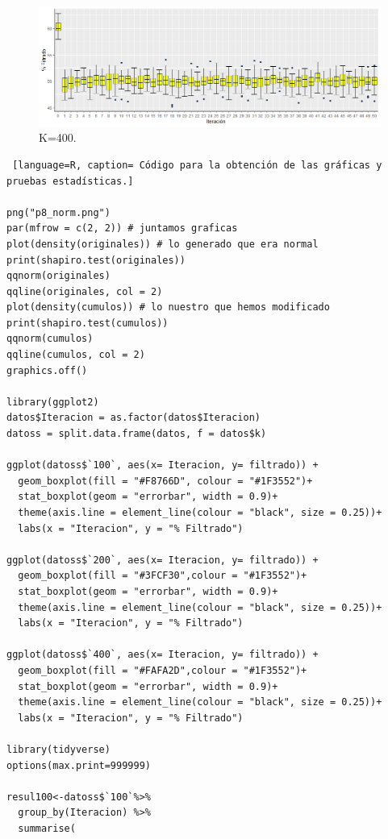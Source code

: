 \documentclass{article}
\begin{document}
\newpage
\begin{figure} [h!]%
\renewcommand{\figurename}{Gráfica}
    \centering
    \caption{ K=400.}
    \label{grafica3}
    \includegraphics[width=170mm]{grafica3.png} %
\end{figure}

\begin{lstlisting} [language=R, caption= Código para la obtención de las gráficas y pruebas estadísticas.]

png("p8_norm.png")
par(mfrow = c(2, 2)) # juntamos graficas
plot(density(originales)) # lo generado que era normal
print(shapiro.test(originales))
qqnorm(originales)
qqline(originales, col = 2)
plot(density(cumulos)) # lo nuestro que hemos modificado
print(shapiro.test(cumulos))
qqnorm(cumulos)
qqline(cumulos, col = 2)
graphics.off()

library(ggplot2)
datos$Iteracion = as.factor(datos$Iteracion)
datoss = split.data.frame(datos, f = datos$k)

ggplot(datoss$`100`, aes(x= Iteracion, y= filtrado)) + 
  geom_boxplot(fill = "#F8766D", colour = "#1F3552")+
  stat_boxplot(geom = "errorbar", width = 0.9)+
  theme(axis.line = element_line(colour = "black", size = 0.25))+
  labs(x = "Iteracion", y = "% Filtrado")

ggplot(datoss$`200`, aes(x= Iteracion, y= filtrado)) + 
  geom_boxplot(fill = "#3FCF30",colour = "#1F3552")+
  stat_boxplot(geom = "errorbar", width = 0.9)+
  theme(axis.line = element_line(colour = "black", size = 0.25))+
  labs(x = "Iteracion", y = "% Filtrado")

ggplot(datoss$`400`, aes(x= Iteracion, y= filtrado)) + 
  geom_boxplot(fill = "#FAFA2D",colour = "#1F3552")+
  stat_boxplot(geom = "errorbar", width = 0.9)+
  theme(axis.line = element_line(colour = "black", size = 0.25))+
  labs(x = "Iteracion", y = "% Filtrado")

library(tidyverse)
options(max.print=999999)

resul100<-datoss$`100`%>%
  group_by(Iteracion) %>%
  summarise(
    

\end{lstlisting}
\end{document}
